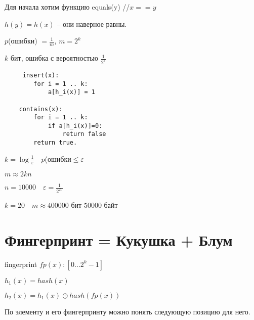 \documentclass{book}
\theoremstyle{definition}
\begin{document}
Для начала хотим функцию  equals(y) //$x == y$

$h(y) = h(x)$ -- они наверное равны.

$p$(ошибки) $=\frac{1}{m}$, $m = 2^k$

 $k$ бит, ошибка с вероятностью  $\frac{1}{2^k}$ 

 \begin{verbatim}
     insert(x):
        for i = 1 .. k:
            a[h_i(x)] = 1

    contains(x):
        for i = 1 .. k:
            if a[h_i(x)]=0:
                return false
        return true.
 \end{verbatim}

 $k = \log \frac{1}{\varepsilon}\quad p$(ошибки$\leqslant \varepsilon$

$m \approx 2kn $

$n=10000\quad \varepsilon=\frac{1}{2^{20}}$ 

$k = 20\quad m \approx 400000$ бит $50000$ байт

\section{Фингерпринт = Кукушка + Блум}

fingerprint $fp(x):[0\ldots 2^k-1]$

$h_1(x) = hash(x)$

$h_2(x) = h_1(x)\oplus hash(fp(x))$ 

По элементу и его фингерпринту можно понять следующую позицию для него.
\end{document}
